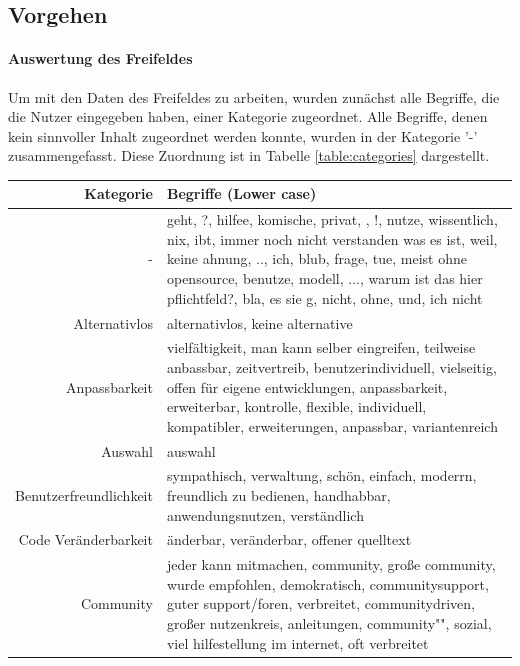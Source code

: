 \documentclass[a4paper]{article}
\begin{document}
        \subsection{Vorgehen}
            \paragraph{Auswertung des Freifeldes}
                Um mit den Daten des Freifeldes zu arbeiten, wurden zunächst alle Begriffe, die die Nutzer eingegeben haben, einer Kategorie zugeordnet. Alle Begriffe, denen kein sinnvoller Inhalt zugeordnet werden konnte, wurden in der Kategorie '-' zusammengefasst. Diese Zuordnung ist in Tabelle \ref{table:categories} dargestellt.\\
            
            \begin{table}[!htbp]
                \begin{tabularx}{\textwidth}{rX}
                    Kategorie & Begriffe (Lower case) \\
                    \hline
                    - & \tiny geht, ?, hilfee, komische, privat, , !, nutze, wissentlich, nix, ibt, immer noch nicht verstanden was es ist, weil, keine ahnung, .., ich, blub, frage, tue, meist ohne opensource, benutze, modell, ..., warum ist das hier pflichtfeld?, bla, es sie g, nicht, ohne, und, ich nicht\\
                    Alternativlos & \tiny alternativlos, keine alternative\\
                    Anpassbarkeit & \tiny vielfältigkeit, man kann selber eingreifen, teilweise anbassbar, zeitvertreib, benutzerindividuell, vielseitig, offen für eigene entwicklungen, anpassbarkeit, erweiterbar, kontrolle, flexible, individuell, kompatibler, erweiterungen, anpassbar, variantenreich\\
                    Auswahl & \tiny auswahl\\
                    Benutzerfreundlichkeit & \tiny sympathisch, verwaltung, schön, einfach, moderrn, freundlich zu bedienen, handhabbar, anwendungsnutzen, verständlich\\
                    Code Veränderbarkeit & \tiny änderbar, veränderbar, offener quelltext\\
                    Community & \tiny jeder kann mitmachen, community, große community, wurde empfohlen, demokratisch, communitysupport, guter support/foren, verbreitet, communitydriven, großer nutzenkreis, anleitungen, community"", sozial, viel hilfestellung im internet, oft verbreitet\\

\end{tabularx}
\end{table}
\end{document}
